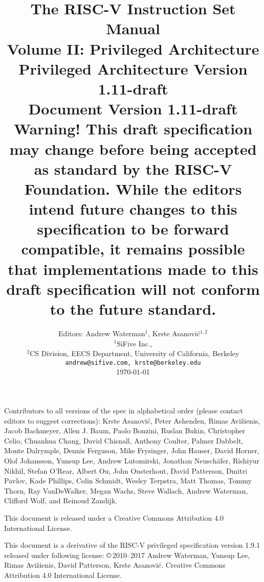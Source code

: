 \documentclass[twoside,11pt]{book}
\newcommand{\privrev}{1.11-draft}
\begin{document}
\title{{\vspace{-0.7in}\Large {\bf The RISC-V Instruction Set Manual}} \\
  \large {\bf Volume II: Privileged Architecture} \\
  Privileged Architecture Version \privrev \\
  Document Version \privrev \\
    {\bf Warning! This draft specification
    may change before being accepted as standard by the RISC-V Foundation.
    While the editors intend future changes to this specification to be
    forward compatible, it remains possible that
    implementations made to this draft specification will not conform
    to the future standard.}
  \vspace{-0.1in}}

\author{Editors: Andrew Waterman$^{1}$, Krste Asanovi\'{c}$^{1,2}$ \\
  $^{1}$SiFive Inc., \\
  $^{2}$CS Division, EECS Department, University of California, Berkeley \\
  {\tt andrew@sifive.com, krste@berkeley.edu} \\
  \today
}

\date{} 
\maketitle

Contributors to all versions of the spec in alphabetical order (please contact
editors to suggest corrections): Krste Asanovi\'{c}, Peter Ashenden, Rimas
Avi\v{z}ienis, Jacob Bachmeyer, Allen J. Baum, Paolo Bonzini, Ruslan Bukin,
Christopher Celio, Chuanhua Chang, David Chisnall, Anthony Coulter, Palmer Dabbelt, Monte
Dalrymple, Dennis Ferguson, Mike Frysinger, John Hauser, David Horner, Olof
Johansson, Yunsup Lee, Andrew Lutomirski, Jonathan Neusch{\"a}fer, Rishiyur
Nikhil, Stefan O'Rear, Albert Ou, John Ousterhout, David Patterson, Dmitri
Pavlov, Kade Phillips, Colin Schmidt, Wesley Terpstra, Matt Thomas, Tommy Thorn, Ray
VanDeWalker, Megan Wachs, Steve Wallach, Andrew Waterman, Clifford Wolf,
and Reinoud Zandijk.

This document is released under a Creative Commons Attribution 4.0
International License.

This document is a derivative of the RISC-V
privileged specification version 1.9.1 released under following license:
\copyright \,2010--2017 Andrew Waterman, Yunsup Lee, Rimas
Avi\v{z}ienis, David Patterson, Krste Asanovi\'{c}. 
Creative Commons Attribution 4.0 International License.
\end{document}
